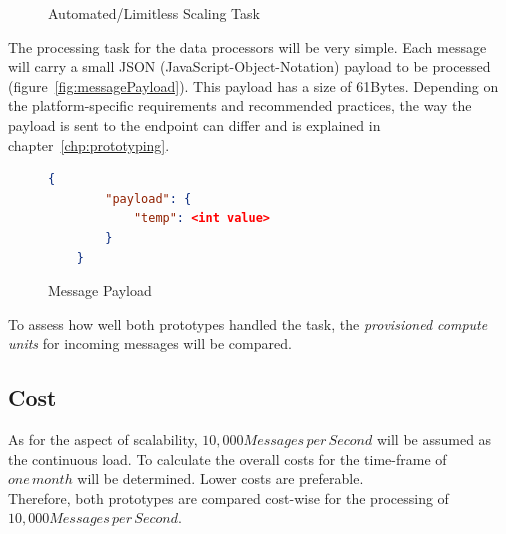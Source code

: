 \begin{figure}[ht]
    \centering
    \caption {Automated/Limitless Scaling Task}
    \label{graph:scalingTask}
\end{figure}

The processing task for the data processors will be very simple. Each message will carry a small JSON (JavaScript-Object-Notation) payload to be processed (figure~\vref{fig:messagePayload}). This payload has a size of 61Bytes. Depending on the platform-specific requirements and recommended practices, the way the payload is sent to the endpoint can differ and is explained in chapter~\vref{chp:prototyping}. 

\begin{figure}
    \begin{lstlisting}[language=json,firstnumber=1]
    {
        "payload": {
            "temp": <int value>
        }
    }
    \end{lstlisting}\centering
    \caption{Message Payload}
    \label{fig:messagePayload}
\end{figure}

To assess how well both prototypes handled the task, the \textit{provisioned compute units} for incoming messages will be compared. 


\subsection{Cost}

As for the aspect of scalability, $10,000 Messages\,per\,Second$ will be assumed as the continuous load. To calculate the overall costs for the time-frame of $one\,month$ will be determined. Lower costs are preferable.\\
Therefore, both prototypes are compared cost-wise for the processing of $10,000 Messages\,per\,Second$.



